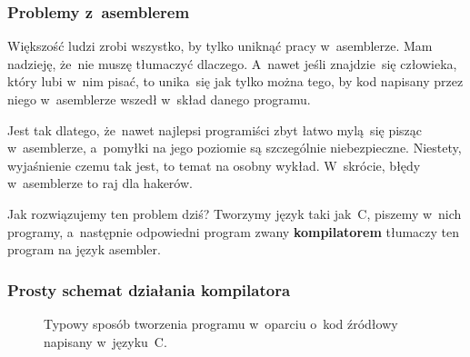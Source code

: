 \documentclass[10pt,t]{beamer}
\begin{document}
\begin{frame}
  \frametitle{Problemy z~asemblerem}


  Większość ludzi zrobi wszystko, by tylko uniknąć pracy w~asemblerze.
  Mam nadzieję, że~nie muszę tłumaczyć dlaczego.  A~nawet jeśli
  znajdzie~się człowieka, który lubi w~nim pisać, to unika~się jak tylko
  można tego, by kod napisany przez niego w~asemblerze wszedł w~skład
  danego programu.

  Jest tak dlatego, że~nawet najlepsi programiści zbyt łatwo mylą~się
  pisząc w~asemblerze, a~pomyłki na jego poziomie są szczególnie
  niebezpieczne. Niestety, wyjaśnienie czemu tak jest, to temat na osobny
  wykład. W~skrócie, błędy w~asemblerze to raj dla hakerów.

  Jak rozwiązujemy ten problem dziś? Tworzymy język taki jak~C, piszemy
  w~nich programy, a~następnie odpowiedni program zwany
  \textbf{kompilatorem} tłumaczy ten program na język asembler.

\end{frame}





\begin{frame}
  \frametitle{Prosty schemat działania kompilatora}


  \begin{figure}


    \caption{Typowy sposób tworzenia programu w~oparciu o~kod źródłowy
      napisany w~języku~C.}


  \end{figure}

\end{frame}
\end{document}
